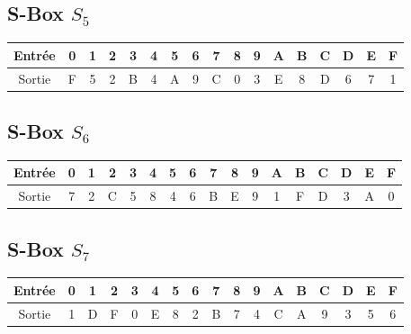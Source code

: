 \documentclass[12pt,a4paper]{report}
\begin{document}
\subsection*{S-Box $S_5$}
\begin{center}
\begin{tabular}{|c|cccccccccccccccc|}
\hline
Entrée & 0 & 1 & 2 & 3 & 4 & 5 & 6 & 7 & 8 & 9 & A & B & C & D & E & F \\
\hline
Sortie & F & 5 & 2 & B & 4 & A & 9 & C & 0 & 3 & E & 8 & D & 6 & 7 & 1 \\
\hline
\end{tabular}
\end{center}

\subsection*{S-Box $S_6$}
\begin{center}
\begin{tabular}{|c|cccccccccccccccc|}
\hline
Entrée & 0 & 1 & 2 & 3 & 4 & 5 & 6 & 7 & 8 & 9 & A & B & C & D & E & F \\
\hline
Sortie & 7 & 2 & C & 5 & 8 & 4 & 6 & B & E & 9 & 1 & F & D & 3 & A & 0 \\
\hline
\end{tabular}
\end{center}

\subsection*{S-Box $S_7$}
\begin{center}
\begin{tabular}{|c|cccccccccccccccc|}
\hline
Entrée & 0 & 1 & 2 & 3 & 4 & 5 & 6 & 7 & 8 & 9 & A & B & C & D & E & F \\
\hline
Sortie & 1 & D & F & 0 & E & 8 & 2 & B & 7 & 4 & C & A & 9 & 3 & 5 & 6 \\
\hline
\end{tabular}
\end{center}
\end{document}
